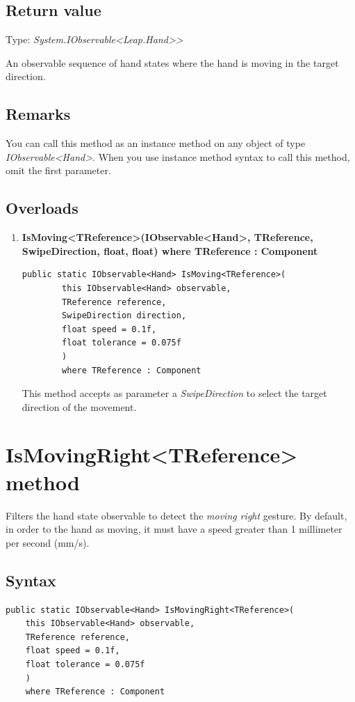 \documentclass[12pt,a4paper,twoside]{report}
\begin{document}
\subsection{Return value}
Type: \textit{System.IObservable<Leap.Hand>{}>}

An observable sequence of hand states where the hand is moving in the target direction.

\subsection{Remarks}
You can call this method as an instance method on any object of type \textit{IObservable<Hand>}. When you use instance method syntax to call this method, omit the first parameter.

\subsection{Overloads}
\begin{enumerate}
    \item \textbf{IsMoving<TReference>(IObservable<Hand>, TReference, SwipeDirection, float, float) where TReference : Component}
\begin{lstlisting}[caption=Declaration]
     public static IObservable<Hand> IsMoving<TReference>(
        this IObservable<Hand> observable,
        TReference reference,
        SwipeDirection direction,
        float speed = 0.1f,
        float tolerance = 0.075f
        ) 
        where TReference : Component
\end{lstlisting}
    This method accepts as parameter a \textit{SwipeDirection} to select the target direction of the movement.
\end{enumerate}

\newpage

\section{IsMovingRight<TReference> method}
Filters the hand state observable to detect the \textit{moving right} gesture. By default, in order to the hand as moving, it must have a speed greater than 1 millimeter per second (mm/s).

\subsection{Syntax}
\begin{lstlisting}[caption=Declaration]
  public static IObservable<Hand> IsMovingRight<TReference>(
    this IObservable<Hand> observable,
    TReference reference,
    float speed = 0.1f,
    float tolerance = 0.075f
    )
    where TReference : Component
\end{lstlisting}
\end{document}
